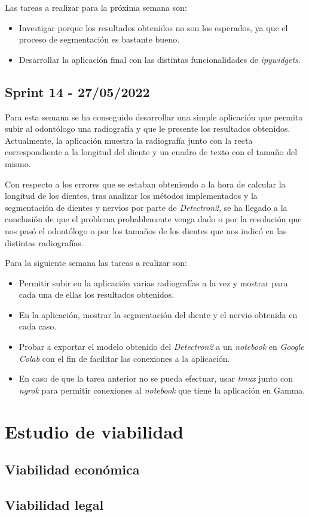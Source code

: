 Las tareas a realizar para la próxima semana son:
\begin{itemize}
    \item Investigar porque los resultados obtenidos no son los esperados, ya que el proceso de segmentación es bastante bueno.
    \item Desarrollar la aplicación final con las distintas funcionalidades de \emph{ipywidgets}.
\end{itemize}
\subsection{Sprint 14 - 27/05/2022}
Para esta semana se ha conseguido desarrollar una simple aplicación que permita subir al odontólogo una radiografía y que le presente los resultados obtenidos. Actualmente, la aplicación muestra la radiografía junto con la recta correspondiente a la longitud del diente y un cuadro de texto con el tamaño del mismo.

Con respecto a los errores que se estaban obteniendo a la hora de calcular la longitud de los dientes, tras analizar los métodos implementados y la segmentación de dientes y nervios por parte de \emph{Detectron2}, se ha llegado a la conclusión de que el problema probablemente venga dado o por la resolución que nos pasó el odontólogo o por los tamaños de los dientes que nos indicó en las distintas radiografías.

Para la siguiente semana las tareas a realizar son:
\begin{itemize}
    \item Permitir subir en la aplicación varias radiografías a la vez y mostrar para cada una de ellas los resultados obtenidos.
    \item En la aplicación, mostrar la segmentación del diente y el nervio obtenida en cada caso.
    \item Probar a exportar el modelo obtenido del \emph{Detectron2} a un \emph{notebook} en \emph{Google Colab} con el fin de facilitar las conexiones a la aplicación.
    \item En caso de que la tarea anterior no se pueda efectuar, usar \emph{tmux} junto con \emph{ngrok} para permitir conexiones al \emph{notebook} que tiene la aplicación en Gamma.
\end{itemize}
\section{Estudio de viabilidad}

\subsection{Viabilidad económica}

\subsection{Viabilidad legal}



